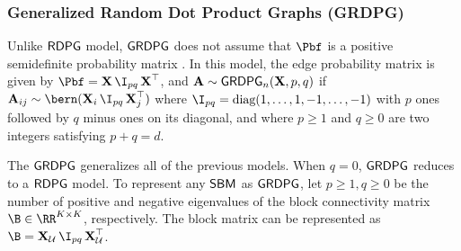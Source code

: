 
\subsubsection{Generalized Random Dot Product Graphs (GRDPG)}\label{sec:grdpg}
Unlike $\operatorname{\mathsf{RDPG}}$ model, $\operatorname{\mathsf{GRDPG}}$ does not assume that $\Pbf$ is a positive semidefinite probability matrix  \cite{rubin2017statistical}. In this model, the edge probability matrix is given by $\Pbf=\X \I_{pq}\X^\top$, and $\operatorname{\mathbf{A}}\sim\operatorname{\mathsf{GRDPG}}_n(
\operatorname{\mathbf{X}}, p, q)$ if $\A_{ij}\sim\bern(\X_i\I_{pq}\X_j^\top)$ where $\I_{pq}=\textrm{diag}(1, \ldots, 1, -1, \ldots, -1)$  with $p$ ones followed by $q$ minus ones on its diagonal, and where $p \geq 1$ and $q \geq 0$ are two integers satisfying $p + q = d$.

The $\operatorname{\mathsf{GRDPG}}$ generalizes all of the previous models. When $q=0$, $\operatorname{\mathsf{GRDPG}}$ reduces to a $\operatorname{\mathsf{RDPG}}$ model. To represent any $\operatorname{\mathsf{SBM}}$ as $\operatorname{\mathsf{GRDPG}}$, let $p\geq 1, q\geq 0$ be the number of positive and negative eigenvalues of the block connectivity matrix $\B\in\RR^{K\times K}$, respectively. The block matrix can be represented as $\B = \X_\mathcal{U}\I_{pq}\X_\mathcal{U}^\top$.


